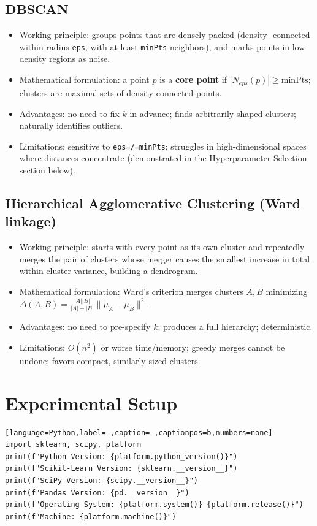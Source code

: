\documentclass[12pt,a4paper]{article}
\begin{document}
\subsection{DBSCAN}
\label{sec:orgae7d7ec}
\begin{itemize}
\item Working principle: groups points that are densely packed (density-
connected within radius \texttt{eps}, with at least \texttt{minPts} neighbors), and
marks points in low-density regions as noise.
\item Mathematical formulation: a point \(p\) is a \textbf{core point} if
\(|N_{eps}(p)| \geq \text{minPts}\); clusters are maximal sets of
density-connected points.
\item Advantages: no need to fix \(k\) in advance; finds arbitrarily-shaped
clusters; naturally identifies outliers.
\item Limitations: sensitive to \texttt{eps=/=minPts}; struggles in high-dimensional
spaces where distances concentrate (demonstrated in the Hyperparameter
Selection section below).
\end{itemize}

\subsection{Hierarchical Agglomerative Clustering (Ward linkage)}
\label{sec:orgfe5a476}
\begin{itemize}
\item Working principle: starts with every point as its own cluster and
repeatedly merges the pair of clusters whose merger causes the smallest
increase in total within-cluster variance, building a dendrogram.
\item Mathematical formulation: Ward's criterion merges clusters \(A, B\)
minimizing \(\Delta(A,B) = \frac{|A||B|}{|A|+|B|}\lVert \mu_A - \mu_B \rVert^2\).
\item Advantages: no need to pre-specify \(k\); produces a full hierarchy;
deterministic.
\item Limitations: \(O(n^2)\) or worse time/memory; greedy merges cannot be
undone; favors compact, similarly-sized clusters.
\end{itemize}

\section{Experimental Setup}
\label{sec:orgfc75d9f}

\begin{lstlisting}[language=Python,label= ,caption= ,captionpos=b,numbers=none]
import sklearn, scipy, platform
print(f"Python Version: {platform.python_version()}")
print(f"Scikit-Learn Version: {sklearn.__version__}")
print(f"SciPy Version: {scipy.__version__}")
print(f"Pandas Version: {pd.__version__}")
print(f"Operating System: {platform.system()} {platform.release()}")
print(f"Machine: {platform.machine()}")
\end{lstlisting}
\end{document}

